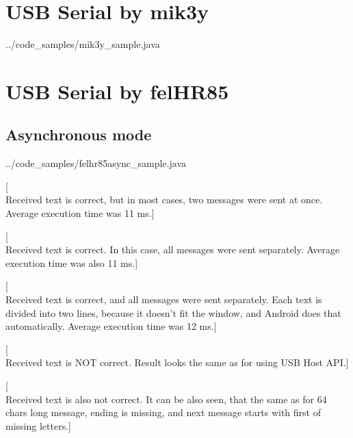 \clearpage

\section{USB Serial by mik3y}


{../code_samples/mik3y_sample.java}

\clearpage

\section{USB Serial by felHR85}

\subsection{Asynchronous mode}


{../code_samples/felhr85async_sample.java}

[\\Received text is correct, but in most cases, two messages were sent at once.
Average execution time was 11 ms.]

[\\Received text is correct. 
In this case, all messages were sent separately.
Average execution time was also 11 ms.]


[\\Received text is correct, and all messages were sent separately.
Each text is divided into two lines, because it doesn't fit the window, and
Android does that automatically.
Average execution time was 12 ms.]

[\\Received text is  NOT correct.
Result looks the same as for using USB Host API.]

[\\Received text is also not correct.
It can be also seen, that the same as for 64 chars long message, ending is
missing, and next message starts with first of missing letters.]

